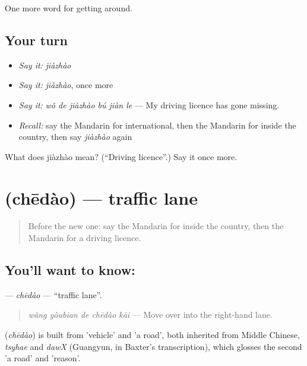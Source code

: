 \begin{grammarlens}[title={What you've built}]
One more word for getting around.
\end{grammarlens}

\subsection*{Your turn}
\begin{itemize}
\raggedright
  \item \emph{Say it:} \emph{jiàzhào}
  \item \emph{Say it:} \emph{jiàzhào}, once more
  \item \emph{Say it:} \emph{wǒ de jiàzhào bú jiàn le} — My driving licence has gone missing.
  \item \emph{Recall:} say the Mandarin for international, then the Mandarin for inside the country, then say \emph{jiàzhào} again
\end{itemize}

\begin{tcolorbox}[breakable,colback=teal!4,colframe=teal!35!black,title={Before you move on}]
What does jiàzhào mean? (\textquotedblleft{}Driving licence\textquotedblright{}.) Say it once more.
\end{tcolorbox}
\section[\texorpdfstring{\zh{车道} (chēdào)}{车道 (chēdào)}]{ (chēdào) — traffic lane}

\label{lesson:ZH-C420-chedao}



\begin{quote}
Before the new one: say the Mandarin for inside the country, then the Mandarin for a driving licence.
\end{quote}

\subsection*{You'll want to know: }
\textbf{} — \emph{chēdào} — \textquotedblleft{}traffic lane\textquotedblright{}.

\begin{quote}
\emph{wǎng yòubian de chēdào kāi} — Move over into the right-hand lane.
\end{quote}

\begin{cousinweb}
\textbf{} (\emph{chēdào}) is built from  'vehicle' and  'a road', both inherited from Middle Chinese, \emph{tsyhae} and \emph{dawX} (Guangyun, in Baxter's transcription), which glosses the second 'a road' and 'reason'.
\end{cousinweb}

